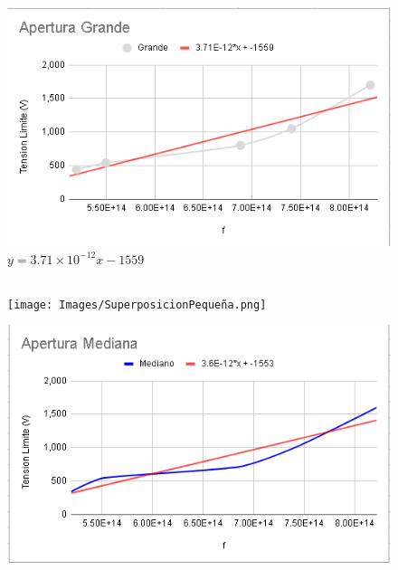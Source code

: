 \documentclass[letterpaper, 12pt]{article}
\begin{document}
\begin{figure}[H]
      \begin{center}
            \includegraphics[width=.7\linewidth]{Images/TendenciaGrande.png}
            \caption{$y = 3.71 \times 10^{-12}x - 1559$}
      \end{center}
\end{figure}

\subsection{}

\begin{figure}[H]
      \begin{center}
            \texttt{[image: Images/SuperposicionPequeña.png]}
            \caption{}
      \end{center}
\end{figure}

\begin{figure}[H]
      \begin{center}
            \includegraphics[width=.7\linewidth]{Images/SuperposicionMediana.png}
            \caption{}
      \end{center}
\end{figure}
\end{document}
